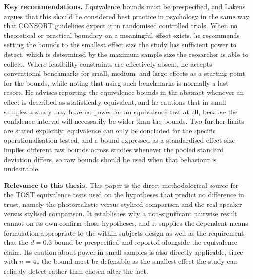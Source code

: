 \documentclass[11pt, a4paper]{article}
\begin{document}
\textbf{Key recommendations.} Equivalence bounds must be prespecified, and Lakens argues that this should be considered best practice in psychology in the same way that CONSORT guidelines expect it in randomised controlled trials. When no theoretical or practical boundary on a meaningful effect exists, he recommends setting the bounds to the smallest effect size the study has sufficient power to detect, which is determined by the maximum sample size the researcher is able to collect. Where feasibility constraints are effectively absent, he accepts conventional benchmarks for small, medium, and large effects as a starting point for the bounds, while noting that using such benchmarks is normally a last resort. He advises reporting the equivalence bounds in the abstract whenever an effect is described as statistically equivalent, and he cautions that in small samples a study may have no power for an equivalence test at all, because the confidence interval will necessarily be wider than the bounds. Two further limits are stated explicitly: equivalence can only be concluded for the specific operationalisation tested, and a bound expressed as a standardised effect size implies different raw bounds across studies whenever the pooled standard deviation differs, so raw bounds should be used when that behaviour is undesirable.

\textbf{Relevance to this thesis.} This paper is the direct methodological source for the TOST equivalence tests used on the hypotheses that predict no difference in trust, namely the photorealistic versus stylised comparison and the real speaker versus stylised comparison. It establishes why a non-significant pairwise result cannot on its own confirm those hypotheses, and it supplies the dependent-means formulation appropriate to the within-subjects design as well as the requirement that the $d = 0.3$ bound be prespecified and reported alongside the equivalence claim. Its caution about power in small samples is also directly applicable, since with $n = 41$ the bound must be defensible as the smallest effect the study can reliably detect rather than chosen after the fact.

\vspace{8pt}
\end{document}
